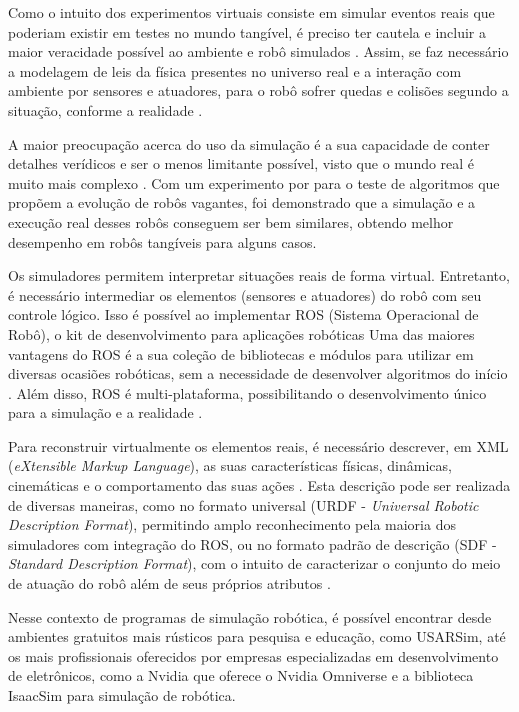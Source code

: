Como o intuito dos experimentos virtuais consiste em simular eventos reais que poderiam existir em testes no mundo tangível, é preciso ter cautela e incluir a maior veracidade possível ao ambiente e robô simulados \cite{aprendizadoHeinen:2010}.  
Assim, se faz necessário a modelagem de leis da física presentes no universo real e a interação com ambiente por sensores e atuadores, para o robô sofrer quedas e colisões segundo a situação, conforme a realidade \cite{usarsimCarpin:2007, evolucaoHeinen:2006}.  

A maior preocupação acerca do uso da simulação é a sua capacidade de conter detalhes verídicos e ser o menos limitante possível, visto que o mundo  real é muito mais complexo  \cite{wanderingMiglino:1994}. 
Com um experimento por \citet{wanderingMiglino:1994} para o teste de algoritmos que propõem a evolução de robôs vagantes, foi demonstrado que a simulação e a execução real desses robôs conseguem ser bem similares, obtendo melhor desempenho em robôs tangíveis para alguns casos.

Os simuladores permitem interpretar situações reais de forma virtual. Entretanto, é necessário intermediar os elementos (sensores e atuadores) do robô com seu controle lógico. Isso é possível ao implementar ROS (Sistema Operacional de Robô), o kit de desenvolvimento para aplicações robóticas \cite{ROS} Uma das maiores vantagens do ROS é a sua coleção de bibliotecas e módulos para utilizar em diversas ocasiões robóticas, sem a necessidade de desenvolver algoritmos do início \cite{ROS}. Além disso, ROS é multi-plataforma, possibilitando o desenvolvimento único  para a simulação e a realidade \cite{ROS}.

Para reconstruir virtualmente os elementos reais, é necessário descrever, em XML (\textit{eXtensible Markup Language}), as suas características físicas, dinâmicas, cinemáticas e o comportamento das suas ações \cite{geradorURDF:2019, geradorURDF:2022, sdf:2019}. Esta descrição pode ser realizada de diversas maneiras, como no formato universal (URDF - \textit{Universal Robotic Description Format}), permitindo amplo reconhecimento pela maioria dos simuladores com integração do ROS, ou no formato padrão de descrição (SDF - \textit{Standard Description Format}), com o intuito de caracterizar o conjunto do meio de atuação do robô além de seus próprios atributos \cite{geradorURDF:2019, geradorURDF:2022, sdf:2019}.

Nesse contexto de programas de simulação robótica,  é possível encontrar desde ambientes gratuitos mais rústicos para pesquisa e educação, como USARSim,  até os mais profissionais oferecidos por empresas especializadas em desenvolvimento de eletrônicos, como a Nvidia que oferece o Nvidia Omniverse e a biblioteca IsaacSim para simulação de robótica. 

